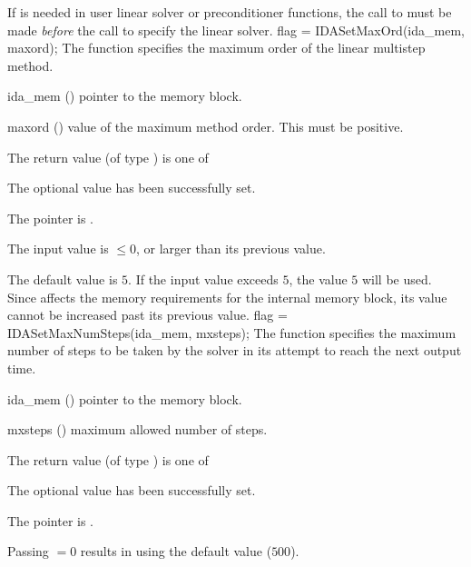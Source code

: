 {{  {\warn}If  is needed in user linear solver or preconditioner
  functions, the call to  must be made {\it before} the call
  to specify the linear solver.
}
{
flag = IDASetMaxOrd(ida\_mem, maxord);
}
{
  The function  specifies the maximum order of the
  linear multistep method.
}
{
  \begin{args}
  \item[ida\_mem] ()
    pointer to the {\idas} memory block.
  \item[maxord] ()
    value of the maximum method order.  This must be positive.
  \end{args}
}
{
  The return value  (of type ) is one of
  \begin{args}
  \item[\Id{IDA\_SUCCESS}]
    The optional value has been successfully set.
  \item[\Id{IDA\_MEM\_NULL}]
    The  pointer is .
  \item[\Id{IDA\_ILL\_INPUT}]
    The input value  is $\leq 0$, or larger than
    its previous value.
  \end{args}
}
{
  The default value is $5$.  If the input value exceeds $5$,
  the value $5$ will be used.   Since  affects the memory
  requirements for the internal {\idas} memory block, its value cannot
  be increased past its previous value.
}
{
flag = IDASetMaxNumSteps(ida\_mem, mxsteps);
}
{
  The function  specifies the maximum number
  of steps to be taken by the solver in its attempt to reach
  the next output time.
}
{
  \begin{args}
  \item[ida\_mem] ()
    pointer to the {\idas} memory block.
  \item[mxsteps] ()
    maximum allowed number of steps.
  \end{args}
}
{
  The return value  (of type ) is one of
  \begin{args}
  \item[\Id{IDA\_SUCCESS}]
    The optional value has been successfully set.
  \item[\Id{IDA\_MEM\_NULL}]
    The  pointer is .
  \end{args}
}
{
  Passing  $= 0$ results in {\idas} using the default value ($500$).

}}
